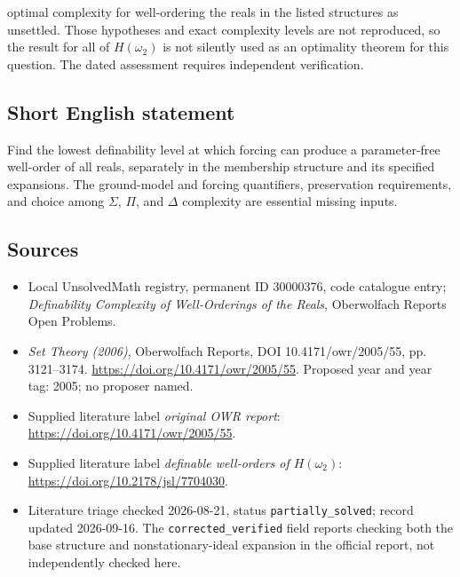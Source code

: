 \documentclass[11pt]{article}
\begin{document}
optimal complexity for well-ordering the reals in the listed structures as unsettled. Those hypotheses and exact complexity levels are not reproduced, so the result for all of \(H(\omega_2)\) is not silently used as an optimality theorem for this question. The dated assessment requires independent verification.
\subsection{Short English statement}
Find the lowest definability level at which forcing can produce a parameter-free well-order of all reals, separately in the membership structure and its specified expansions. The ground-model and forcing quantifiers, preservation requirements, and choice among \(\Sigma\), \(\Pi\), and \(\Delta\) complexity are essential missing inputs.
\subsection{Sources}
\begin{itemize}\item Local UnsolvedMath registry, permanent ID 30000376, code catalogue entry; \emph{Definability Complexity of Well-Orderings of the Reals}, Oberwolfach Reports Open Problems.\item \emph{Set Theory (2006)}, Oberwolfach Reports, DOI 10.4171/owr/2005/55, pp. 3121--3174. \url{https://doi.org/10.4171/owr/2005/55}. Proposed year and year tag: 2005; no proposer named.\item Supplied literature label \emph{original OWR report}: \url{https://doi.org/10.4171/owr/2005/55}.\item Supplied literature label \emph{definable well-orders of \(H(\omega_2)\)}: \url{https://doi.org/10.2178/jsl/7704030}.\item Literature triage checked 2026-08-21, status \texttt{partially\_solved}; record updated 2026-09-16. The \texttt{corrected\_verified} field reports checking both the base structure and nonstationary-ideal expansion in the official report, not independently checked here.\end{itemize}
\end{document}
